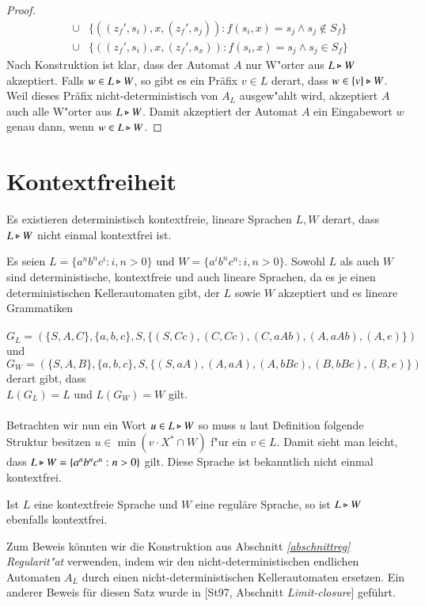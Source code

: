 \begin{proof}
\begin{eqnarray}
 & \cup & \{ ((z_f',s_i),x,(z_f',s_j)) : f(s_i,x)=s_j  \wedge s_j \notin S_f\} \label{auto3}\\
 & \cup & \{ ((z_f',s_i),x,(z_f',s_x)) : f(s_i,x)=s_j  \wedge s_j \in S_f \label{auto4} \}
\end{eqnarray}
Nach Konstruktion ist klar, dass der Automat $A$ nur W"orter aus $L\triangleright W$ akzeptiert. Falls $w\in L\triangleright W$, so gibt es ein Präfix $v\in L$ derart, dass $w\in \{v\}\triangleright W$. Weil dieses Präfix nicht-deterministisch von $A_L$ ausgew"ahlt wird, akzeptiert $A$ auch alle W"orter aus $L\triangleright W$.
Damit akzeptiert der Automat $A$ ein Eingabewort $w$ genau dann, wenn $w\in L\triangleright W$.
\end{proof}

\section{Kontextfreiheit}
Es existieren deterministisch kontextfreie, lineare Sprachen $L,W$ derart, dass $L\triangleright W$ nicht einmal kontextfrei ist.

\vspace{2ex}

\begin{beispiel}
Es seien $L=\{a^nb^nc^i:i,n>0\}$ und $W=\{a^ib^nc^n:i,n>0\}$. Sowohl $L$ als auch $W$ sind deterministische, kontextfreie und auch lineare Sprachen, da es je einen deterministischen Kellerautomaten gibt, der $L$ sowie $W$ akzeptiert und es lineare Grammatiken \\\\$G_L = (\{S,A,C\},\{a,b,c\},S,\{ (S,Cc),(C,Cc),(C,aAb),(A,aAb),(A,e)\})$ und \\$G_W = (\{S,A,B\},\{a,b,c\},S,\{ (S,aA),(A,aA),(A,bBc),(B,bBc),(B,e) \})$ derart gibt, dass \\$L(G_L) = L$ und $L(G_W) = W$ gilt.\\\\
Betrachten wir nun ein Wort $u\in L\triangleright W$ so muss $u$ laut Definition folgende Struktur besitzen $u\in \min( v\cdot X^* \cap W)$ f"ur ein $v \in L$.
Damit sieht man leicht, dass $L\triangleright W= \{a^nb^nc^n:n>0\}$ gilt. Diese Sprache ist bekanntlich nicht einmal kontextfrei.
\end{beispiel}

\vspace{2ex}

\begin{satz}
Ist $L$ eine kontextfreie Sprache und $W$ eine reguläre Sprache, so ist $L\triangleright W$ ebenfalls kontextfrei.
\end{satz}
Zum Beweis könnten wir die Konstruktion aus Abschnitt \emph{\ref{abschnittreg} Regularit"at} verwenden, indem wir den nicht-deterministischen endlichen Automaten $A_L$ durch einen nicht-deterministischen Kellerautomaten ersetzen.
Ein anderer Beweis für diesen Satz wurde in [St97, Abschnitt \emph{Limit-closure}] geführt.
\newpage
